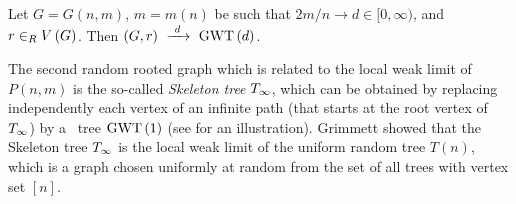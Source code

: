 \begin{thm}\label{thm:local_gnm}
Let $G=G(n,m)$, $m=m(n)$ be such that $2m/n\to d \in [0,\infty)$, and $r\in_RV\left(G\right)$. Then $\left(G, r\right)~\xrightarrow{~d~}~\operatorname{GWT}\left(d\right)$.
\end{thm}

The second random rooted graph which is related to the local weak limit of $P(n,m)$ is the so-called {\em Skeleton tree} $T_\infty$, which can be obtained by replacing independently each vertex of an infinite path (that starts at the root vertex of $T_\infty$) by a \GW\ tree $\operatorname{GWT}\left(1\right)$ (see  for an illustration). Grimmett \cite{Grimmett198081} showed that the Skeleton tree $T_\infty$ is the local weak limit of the uniform random tree $T(n)$, which is a graph chosen uniformly at random from the set of all trees with vertex set $[n]$.

